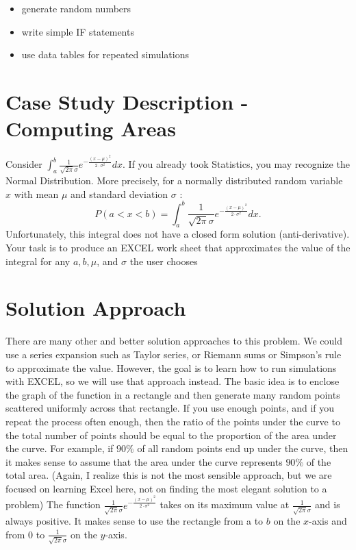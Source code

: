 \documentclass[10pt]{article}
\begin{document}
\begin{itemize}
  \item generate random numbers

  \item write simple IF statements

  \item use data tables for repeated simulations

\end{itemize}
\section{Case Study Description -Computing Areas}
Consider $\int_{a}^{b} \frac{1}{\sqrt{2 \pi} \sigma} e^{-\frac{(x-\mu)^{2}}{2 \cdot \sigma^{2}}} d x$. If you already took Statistics, you may recognize the Normal Distribution. More precisely, for a normally distributed random variable $x$ with mean $\mu$ and standard deviation $\sigma$ :
$$
P(a<x<b)=\int_{a}^{b} \frac{1}{\sqrt{2 \pi} \sigma} e^{-\frac{(x-\mu)^{2}}{2 \cdot \sigma^{2}}} d x .
$$
Unfortunately, this integral does not have a closed form solution (anti-derivative). Your task is to produce an EXCEL work sheet that approximates the value of the integral for any $a, b, \mu$, and $\sigma$ the user chooses

\section{Solution Approach}
There are many other and better solution approaches to this problem. We could use a series expansion such as Taylor series, or Riemann sums or Simpson's rule to approximate the value. However, the goal is to learn how to run simulations with EXCEL, so we will use that approach instead. The basic idea is to enclose the graph of the function in a rectangle and then generate many random points scattered uniformly across that rectangle. If you use enough points, and if you repeat the process often enough, then the ratio of the points under the curve to the total number of points should be equal to the proportion of the area under the curve. For example, if $90 \%$ of all random points end up under the curve, then it makes sense to assume that the area under the curve represents $90 \%$ of the total area. (Again, I realize this is not the most sensible approach, but we are focused on learning Excel here, not on finding the most elegant solution to a problem) The function $\frac{1}{\sqrt{2 \pi} \sigma} e^{-\frac{(x-\mu)^{2}}{2 \cdot \sigma^{2}}}$ takes on its maximum value at $\frac{1}{\sqrt{2 \pi} \sigma}$ and is always positive. It makes sense to use the rectangle from a to $b$ on the $x$-axis and from 0 to $\frac{1}{\sqrt{2 \pi} \sigma}$ on the $y$-axis.
\end{document}
